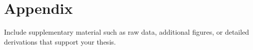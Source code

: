\chapter{Appendix}

Include supplementary material such as raw data, additional figures, or detailed derivations that support your thesis.
